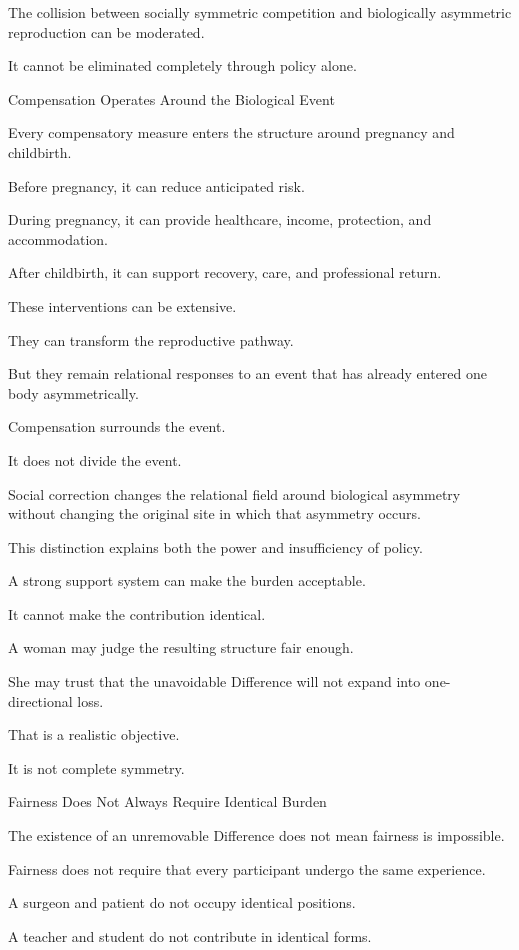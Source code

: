 The collision between socially symmetric competition and biologically asymmetric reproduction can be moderated.

It cannot be eliminated completely through policy alone.

Compensation Operates Around the Biological Event

Every compensatory measure enters the structure around pregnancy and childbirth.

Before pregnancy, it can reduce anticipated risk.

During pregnancy, it can provide healthcare, income, protection, and accommodation.

After childbirth, it can support recovery, care, and professional return.

These interventions can be extensive.

They can transform the reproductive pathway.

But they remain relational responses to an event that has already entered one body asymmetrically.

Compensation surrounds the event.

It does not divide the event.

Social correction changes the relational field around biological asymmetry without changing the original site in which that asymmetry occurs.

This distinction explains both the power and insufficiency of policy.

A strong support system can make the burden acceptable.

It cannot make the contribution identical.

A woman may judge the resulting structure fair enough.

She may trust that the unavoidable Difference will not expand into one-directional loss.

That is a realistic objective.

It is not complete symmetry.

Fairness Does Not Always Require Identical Burden

The existence of an unremovable Difference does not mean fairness is impossible.

Fairness does not require that every participant undergo the same experience.

A surgeon and patient do not occupy identical positions.

A teacher and student do not contribute in identical forms.

